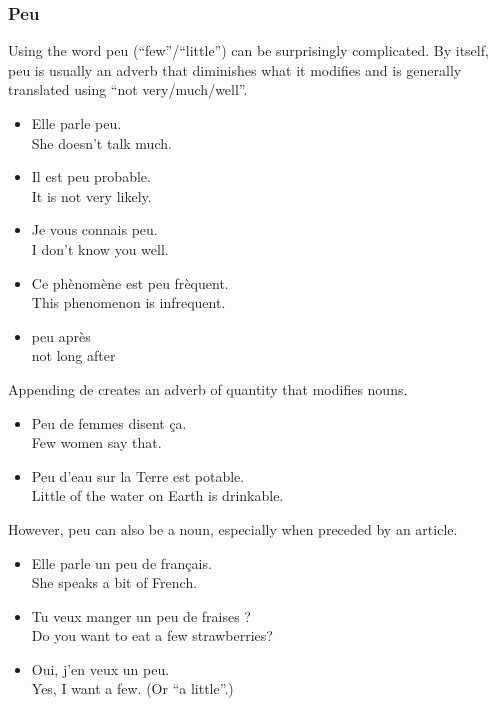\subsubsection{Peu}

Using the word peu (``few''/``little'') can be surprisingly complicated. By itself, peu is usually an adverb that diminishes what it modifies and is generally translated using ``not very/much/well''.

\begin{itemize}
  \item  Elle parle peu. \\ She doesn't talk much.
  \item  Il est peu probable. \\ It is not very likely.
  \item  Je vous connais peu. \\ I don't know you well.
  \item  Ce ph{\`e}nom{\`e}ne est peu fr{\`e}quent. \\ This phenomenon is infrequent.
  \item  peu apr{\`e}s \\ not long after
\end{itemize}

Appending de creates an adverb of quantity that modifies nouns.

\begin{itemize}
  \item  Peu de femmes disent {\c c}a. \\ Few women say that.
  \item  Peu d'eau sur la Terre est potable. \\ Little of the water on Earth is drinkable.
\end{itemize}

However, peu can also be a noun, especially when preceded by an article.

\begin{itemize}
  \item  Elle parle un peu de français. \\ She speaks a bit of French.
  \item  Tu veux manger un peu de fraises ? \\ Do you want to eat a few strawberries?
  \item  Oui, j'en veux un peu. \\ Yes, I want a few. (Or ``a little''.)
\end{itemize}

